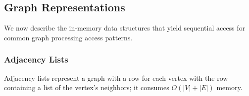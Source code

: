 \subsection{Graph Representations}
\label{sec:bg:reps}
We now describe the in-memory data structures that yield sequential access for common graph processing access patterns.
\subsubsection{Adjacency Lists}
\label{sec:bg:reps:adj}
Adjacency lists represent a graph with a row for each vertex with the row containing a list of the vertex's neighbors; it consumes $O(|V| + |E|)$ memory. %

